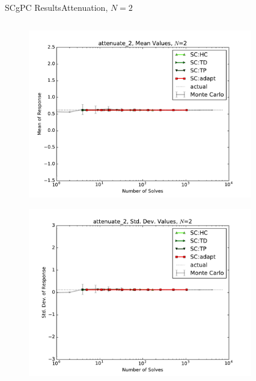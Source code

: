 \documentclass{beamer}
\begin{document}
\begin{frame}{SCgPC Results}{Attenuation, $N=2$}\vspace{-20pt}
 \begin{columns}
   \begin{column}{0.5\textwidth}
        \begin{figure}[h!]
          \centering
          \includegraphics[width=0.8\linewidth]{anlmodels/attenuate_2_mean_vals_nohdmr}
        \end{figure}
        \vspace{-20pt}
        \begin{figure}[h!]
          \centering
          \includegraphics[width=0.8\linewidth]{anlmodels/attenuate_2_var_vals_nohdmr}
        \end{figure}
   \end{column}
   \begin{column}{0.5\textwidth}
        \begin{figure}[h!]
          \centering

\end{figure}
\end{column}
\end{columns}
\end{frame}
\end{document}
